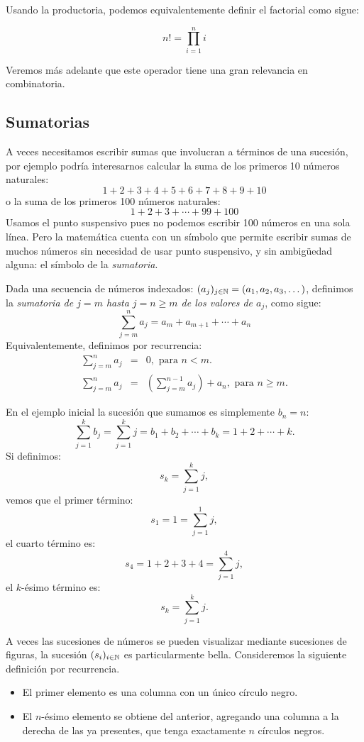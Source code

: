 Usando la productoria, podemos equivalentemente definir el factorial como sigue:

\[ n!=\prod_{i=1}^n i\]

Veremos más adelante que este operador tiene una gran relevancia en combinatoria.


\subsection{Sumatorias}

A veces necesitamos escribir sumas que involucran a términos de una sucesión, por ejemplo podría interesarnos calcular la suma de los primeros 10 números naturales:
$$ 1+2+3+4+5+6+7+8+9+10$$
o la suma de los primeros 100 números naturales:
$$1+2+3+\cdots+99+100$$
Usamos el punto suspensivo pues no podemos escribir 100 números en una sola línea.
Pero la matemática cuenta con un símbolo que permite escribir sumas de muchos números sin necesidad de usar punto suspensivo, y sin ambigüedad alguna: el símbolo de la {\em sumatoria}.

\medskip

\begin{defn}
Dada una secuencia de números indexados: $(a_j)_{j\in\mathbb{N}}=(a_1,a_2,a_3,\dots )$, definimos la \emph{sumatoria de $j=m$ hasta $j=n\ge m$ de los valores de $a_j$}, como sigue:
$$ \sum_{j=m}^n a_j=a_m+a_{m+1}+\cdots+a_n$$
Equivalentemente, definimos por recurrencia:
\begin{eqnarray*}
\sum_{j=m}^{n}a_j&=&0,\textrm{ para }n< m.\\
\sum_{j=m}^{n}a_j&=&\left(\sum_{j=m}^{n-1}a_j\right)+a_n,\textrm{ para }n\ge m.
\end{eqnarray*}
\end{defn}

En el ejemplo inicial la sucesión que sumamos es simplemente $b_n=n$:
$$ \sum_{j=1}^k b_j=\sum_{j=1}^k j = b_1+b_{2}+\cdots+b_k= 1+{2}+\cdots+k.$$
Si definimos:
$$s_k=\sum_{j=1}^k j,$$
vemos que el primer término: 
$$s_1=1=\sum_{j=1}^1 j,$$
el cuarto término es:
$$s_4=1+2+3+4=\sum_{j=1}^4 j,$$
el $k$-ésimo término es:
$$s_k=\sum_{j=1}^k j.$$

A veces las sucesiones de números se pueden visualizar mediante sucesiones de figuras, la sucesión $(s_i)_{i\in\mathbb{N}}$ es particularmente bella. Consideremos la siguiente definición por recurrencia.

\begin{itemize}
\item El primer elemento es una columna con un único círculo negro.
\item El $n$-ésimo elemento se obtiene del anterior, agregando una columna a la derecha de las ya presentes, que tenga exactamente $n$ círculos negros.
\end{itemize}

